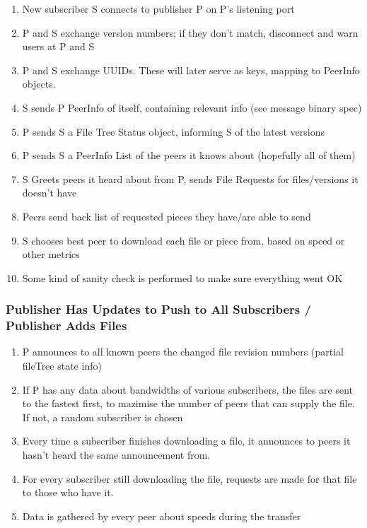 \documentclass[12pt,a4paper,]{book}
\begin{document}
\begin{enumerate}
\def\labelenumi{\arabic{enumi}.}
\itemsep1pt\parskip0pt
\item
  New subscriber S connects to publisher P on P's listening port
\item
  P and S exchange version numbers; if they don't match, disconnect and
  warn users at P and S
\item
  P and S exchange UUIDs. These will later serve as keys, mapping to
  PeerInfo objects.
\item
  S sends P PeerInfo of itself, containing relevant info (see message
  binary spec)
\item
  P sends S a File Tree Status object, informing S of the latest
  versions
\item
  P sends S a PeerInfo List of the peers it knows about (hopefully all
  of them)
\item
  S Greets peers it heard about from P, sends File Requests for
  files/versions it doesn't have
\item
  Peers send back list of requested pieces they have/are able to send
\item
  S chooses best peer to download each file or piece from, based on
  speed or other metrics
\item
  Some kind of sanity check is performed to make sure everything went OK
\end{enumerate}

\subsubsection{Publisher Has Updates to Push to All Subscribers /
Publisher Adds
Files}\label{publisher-has-updates-to-push-to-all-subscribers-publisher-adds-files}

\begin{enumerate}
\def\labelenumi{\arabic{enumi}.}
\itemsep1pt\parskip0pt
\item
  P announces to all known peers the changed file revision numbers
  (partial fileTree state info)
\item
  If P has any data about bandwidths of various subscribers, the files
  are sent to the fastest first, to mazimise the number of peers that
  can supply the file. If not, a random subscriber is chosen
\item
  Every time a subscriber finishes downloading a file, it announces to
  peers it hasn't heard the same announcement from.
\item
  For every subscriber still downloading the file, requests are made for
  that file to those who have it.
\item
  Data is gathered by every peer about speeds during the transfer
\end{enumerate}
\end{document}
